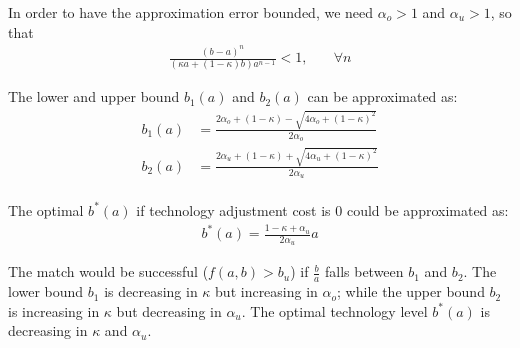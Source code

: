 \documentclass{article}
\newcommand{\1}{\mathbb{1}}
\begin{document}
In order to have the approximation error bounded, we need $\alpha_o>1$ and $\alpha_u>1$, so that
\begin{align*}
\frac{(b-a)^n}{(\kappa a+(1-\kappa) b)a^{n-1}}<1, &\quad\forall n 
\end{align*}

The lower and upper bound $b_1(a)$ and $b_2(a)$ can be approximated as: 
\begin{align*}
b_1(a) &=\frac{2\alpha_o+(1-\kappa)-\sqrt{4\alpha_o+(1-\kappa)^2}}{2\alpha_o} \\
b_2(a) &=\frac{2\alpha_u+(1-\kappa)+\sqrt{4\alpha_u+(1-\kappa)^2}}{2\alpha_u} \\
\end{align*}

The optimal $b^{*}(a)$ if technology adjustment cost is 0 could be approximated as:
\begin{align*}
b^{*}(a) = \frac{1-\kappa+\alpha_u}{2\alpha_u}a
\end{align*}

The match would be successful ($f(a,b)>b_u$) if $\frac{b}{a}$ falls between $b_1$ and $b_2$. The lower bound $b_1$ is decreasing in $\kappa$ but increasing in $\alpha_o$; while the upper bound $b_2$ is increasing in $\kappa$ but decreasing in $\alpha_u$. The optimal technology level $b^{*}(a)$ is decreasing in $\kappa$ and $\alpha_u$. \\
\end{document}
